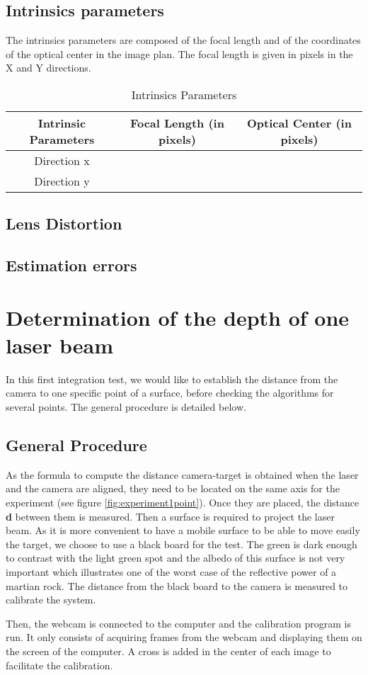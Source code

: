 \subsection{Intrinsics parameters}
The intrinsics parameters are composed of the focal length and of the coordinates of the optical center in the image plan. The focal length is given in pixels in the X and Y directions. 

\begin{table}[H]
\centering
\caption{Intrinsics Parameters}
\label{intrisicsPara}
\renewcommand{\arraystretch}{1.5}
\begin{tabular}{|c|c|c|}
\hline
Intrinsic Parameters & Focal Length (in pixels) & Optical Center (in pixels)\\ \hline
Direction x &  &  \\ \hline
Direction y &  &  \\ 
\hline
\end{tabular}
\end{table}

\subsection{Lens Distortion}

\subsection{Estimation errors}

\section{Determination of the depth of one laser beam}
In this first integration test, we would like to establish the distance from the camera to one specific point of a surface, before checking the algorithms for several points. The general procedure is detailed below. 

\subsection{General Procedure}
As the formula to compute the distance camera-target is obtained when the laser and the camera are aligned, they need to be located on the same axis for the experiment (see figure \ref{fig:experiment1point}). Once they are placed, the distance \textbf{d} between them is measured. Then a surface is required to project the laser beam. As it is more convenient to have a mobile surface to be able to move easily the target, we choose to use a black board for the test. The green is dark enough to contrast with the light green spot and the albedo of this surface is not very important which illustrates one of the worst case of the reflective power of a martian rock. The distance from the black board to the camera is measured to calibrate the system.

Then, the webcam is connected to the computer and the calibration program is run. It only consists of acquiring frames from the webcam and displaying them on the screen of the computer. A cross is added in the center of each image to facilitate the calibration. 